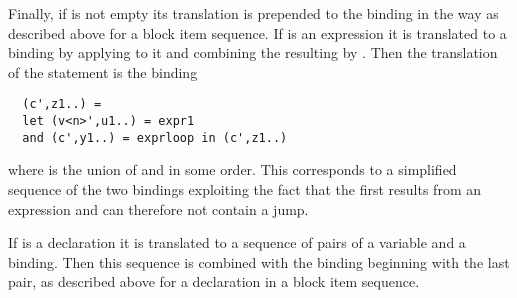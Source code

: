 Finally, if  is not empty its translation is prepended to the binding  in the way as described 
above for a block item sequence. If  is an expression it is translated to a binding  by 
applying  to it and 
combining the resulting  by . Then the translation of the  statement is the binding
\begin{verbatim}
  (c',z1..) = 
  let (v<n>',u1..) = expr1
  and (c',y1..) = exprloop in (c',z1..)
\end{verbatim}
where  is the union of  and  in some order. This corresponds to a simplified sequence of the two 
bindings exploiting the fact that the first results from an expression and can therefore not contain a jump.

If  is a declaration it is translated to a sequence of pairs of a variable and a binding. Then this sequence is combined
with the binding  beginning with the last pair, as described above for a declaration in a block item
sequence.

